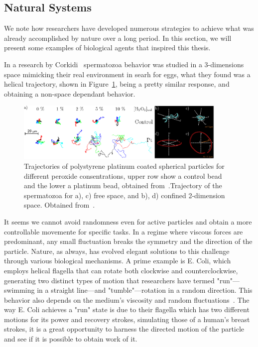 \subsection{Natural Systems}

We note how researchers have developed numerous strategies to achieve what was already accomplished by nature over a long period. In this section, we will present some examples of biological agents that inspired this thesis.

 In a research by Corkidi~\cite{corkidi2008tracking} spermatozoa behavior was studied in a 3-dimensions space mimicking their real environment in searh for eggs, what they found was a helical trajectory, shown in Figure~\ref{fig:corkidiexperiment}, being a pretty similar response, and obtaining a non-space dependant behavior.

\begin{figure}[h]
  \begin{center}
    \includegraphics[width=0.90\textwidth]{figures/randomwalk.pdf}
  \end{center}
  \caption[Random Walk for active brownian particles.]{Trajectories of polystyrene platinum coated spherical particles for different peroxide consentrations, upper row show a control bead and the lower a platinum bead, obtained from~\cite{howse2007self}.Trajectory of the spermatozoa for a), c) free space, and b), d) confined 2-dimension space. Obtained from~\cite{corkidi2008tracking}.}\label{fig:corkidiexperiment}
\end{figure}



It seems we cannot avoid randomness even for active particles and obtain a more controllable movemente for specific tasks. In a regime where viscous forces are predominant, any small fluctuation breaks the symmetry and the direction of the particle. Nature, as always, has evolved elegant solutions to this challenge through various biological mechanisms. A prime example is E. Coli, which employs helical flagella that can rotate both clockwise and counterclockwise, generating two distinct types of motion that researchers have termed "run"—swimming in a straight line—and "tumble"—rotation in a random direction. This behavior also depends on the medium's viscosity and random fluctuations~\cite{kumar2010physics}. The way E. Coli achieves a "run" state is due to their flagella which has two different motions for its power and recovery strokes, simulating those of a human's breast strokes, it is a great opportunity to harness the directed motion of the particle and see if it is possible to obtain work of it. 


